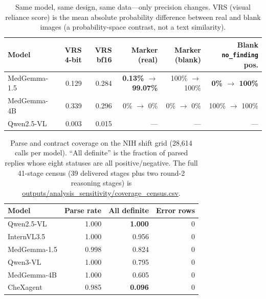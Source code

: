 \begin{table}[H]
\centering
\small
\caption{Same model, same design, same data---only precision changes. VRS (visual reliance score) is the mean absolute probability difference between real and blank images (a probability-space contrast, not a text similarity).}
\label{tab:precision}
\begin{tabular}{lrrrrr}
\toprule
Model & VRS 4-bit & VRS bf16 & Marker (real) & Marker (blank) & Blank \texttt{no\_finding} pos. \\
\midrule
MedGemma-1.5 & 0.129 & 0.284 & \textbf{0.13\% $\rightarrow$ 99.07\%} & 100\% $\rightarrow$ 100\% & \textbf{0\% $\rightarrow$ 100\%} \\
MedGemma-4B & 0.339 & 0.296 & 0\% $\rightarrow$ 0\% & 0\% $\rightarrow$ 0\% & 100\% $\rightarrow$ 100\% \\
Qwen2.5-VL & 0.003 & 0.015 & --- & --- & --- \\
\bottomrule
\end{tabular}
\end{table}

\begin{table}[H]
\centering
\small
\caption{Parse and contract coverage on the NIH shift grid (28,614 calls per model). ``All definite'' is the fraction of parsed replies whose eight statuses are all positive/negative. The full 41-stage census (39 delivered stages plus two round-2 reasoning stages) is \url{outputs/analysis_sensitivity/coverage_census.csv}.}
\label{tab:coverage}
\begin{tabular}{lrrr}
\toprule
Model & Parse rate & All definite & Error rows \\
\midrule
Qwen2.5-VL & 1.000 & \textbf{1.000} & 0 \\
InternVL3.5 & 1.000 & 0.956 & 0 \\
MedGemma-1.5 & 0.998 & 0.824 & 0 \\
Qwen3-VL & 1.000 & 0.795 & 0 \\
MedGemma-4B & 1.000 & 0.605 & 0 \\
CheXagent & 0.985 & \textbf{0.096} & 0 \\
\bottomrule
\end{tabular}
\end{table}

